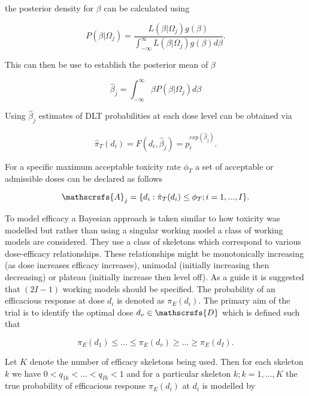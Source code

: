 the posterior density for $\beta$ can be calculated using  

\begin{equation}
P(\beta|\Omega_j) = \frac{L(\beta|\Omega_j)g(\beta)}{\int_{-\infty}^{\infty}L(\beta|\Omega_j)g(\beta)d\beta}. 
\end{equation}

This can then be use to establish the posterior mean of $\beta$

\begin{equation}
\hat{\beta}_j = \int_{-\infty}^{\infty}\beta P(\beta|\Omega_j)d\beta
\end{equation} 

Using $\hat{\beta}_j$ estimates of DLT probabilities at each dose level can be obtained via 

\begin{equation}
\hat{\pi}_T(d_i) = F(d_i, \hat{\beta}_j) = p_i^{exp(\hat{\beta}_j)}. 
\end{equation}

For a specific maximum acceptable toxicity rate $\phi_T$ a set of acceptable or admissible doses can be declared as follows

\begin{equation}
\mathscrsfs{A}_j = \{d_i : \hat{\pi}_T(d_i)  \leq \phi_T ; i = 1,...,I \}.
\end{equation} 

To model efficacy a Bayesian approach is taken similar to how toxicity was modelled but rather than using a singular working model a class of working models are considered. They use a class of skeletons which correspond to various dose-efficacy relationships. These relationships might be monotonically increasing (as dose increases efficacy increases), unimodal (initially increasing then decreasing) or plateau (initially increase then level off). As a guide it is suggested that $(2I-1)$ working models should be specified. The probability of an efficacious response at dose $d_i$ is denoted as $\pi_E(d_i)$. The primary aim of the trial is to identify the optimal dose $d_v \in \mathscrsfs{D}$ which is defined such  that 

\begin{equation}
\pi_E(d_1) \leq ... \leq \pi_E(d_v) \geq ... \geq \pi_E(d_I). 
\end{equation}

Let $K$ denote the number of efficacy skeletons being used. Then for each skeleton $k$ we have $0 < q_{1k} < ... <q_{Ik} <1$ and for a particular skeleton $k; k = 1,...,K$ the true probability of efficacious response $\pi_E(d_i)$ at $d_i$ is modelled by 

